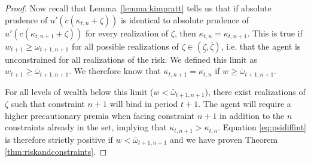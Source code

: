\documentclass[titlepage]{\econtex}
\providecommand{\wAlt}{\omega}
\begin{document}
\begin{proof}
    Now recall that Lemma~\ref{lemma:kimpratt} tells us that if absolute prudence of $u'(c(\kappa_{t,n}+\zeta))$ is identical to absolute prudence of $u'({c}(\kappa_{t,n+1}+\zeta))$ for every realization of $\zeta$, then $\kappa_{t,n}=\kappa_{t,n+1}$. This is true if $w_{t+1} \geq \wAlt_{t+1,n+1}$ for all possible realizations of $\zeta \in (\underline{\zeta}, \bar{\zeta})$, i.e. that the agent is unconstrained for all realizations of the risk. We defined this limit as $w_{t+1} \geq {\bar{\wAlt}}_{t+1,n+1}$. We therefore know that $\kappa_{t,n+1}  = \kappa_{t,n}$ if ${w} \geq {\bar{\wAlt}}_{t+1,n+1}$. 
    
    For all levels of wealth below this limit (${w} < {\bar{\wAlt}}_{t+1,n+1}$), there exist realizations of $\zeta$ such that constraint $n+1$ will bind in period $t+1$. The agent will require a higher precautionary premia when facing constraint $n+1$ in addition to the $n$ constraints already in the set, implying that $\kappa_{t,n+1} > \kappa_{t,n}$. Equation \eqref{eq:psidiffint} is therefore strictly positive if ${w} < {\bar{\wAlt}}_{t+1,n+1}$ and we have proven Theorem \ref{thm:riskandconstraints}. 
    

\end{proof}
\end{document}
